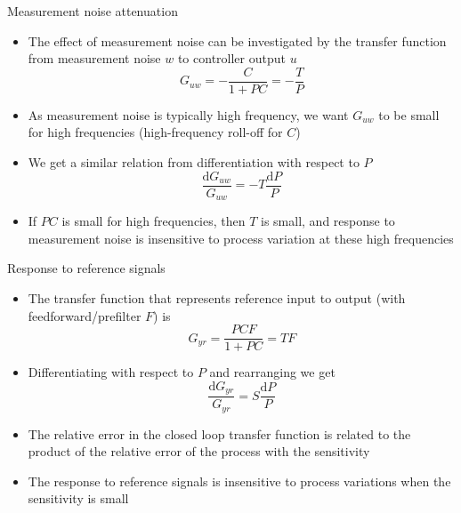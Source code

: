 \documentclass[10pt]{beamer-control}
\begin{document}
\begin{frame}{Measurement noise attenuation}
	\begin{itemize}
		\item The effect of measurement noise can be investigated by the transfer function from measurement noise $w$ to controller output $u$
		\begin{equation}G_{uw}=-\frac{C}{1+PC}=-\frac{T}{P}\end{equation}
		\item As measurement noise is typically high frequency, we want $G_{uw}$ to be small for high frequencies (high-frequency roll-off for $C$)
		\item We get a similar relation from differentiation with respect to $P$
		\begin{equation}\frac{\mathrm{d}G_{uw}}{G_{uw}}=-T\frac{\mathrm{d}P}{P}\end{equation}
		\item If $PC$ is small for high frequencies, then $T$ is small, and response to measurement noise is insensitive to process variation at these high frequencies
	\end{itemize}
\end{frame}


\begin{frame}{Response to reference signals}
	\begin{itemize}
		\item The transfer function that represents reference input to output (with feedforward/prefilter $F$) is
		\begin{equation}G_{yr} = \frac{PCF}{1+PC}=TF\end{equation}
		\item Differentiating with respect to $P$ and rearranging we get
		\begin{equation}\frac{\mathrm{d}G_{yr}}{G_{yr}}=S\frac{\mathrm{d}P}{P}\end{equation}
		\item The relative error in the closed loop transfer function is related to the product of the relative error of the process with the sensitivity
		\item The response to reference signals is insensitive to process variations when the sensitivity is small
	\end{itemize}
\end{frame}

\SUMMARYFRAME
\FINALE
\end{document}

